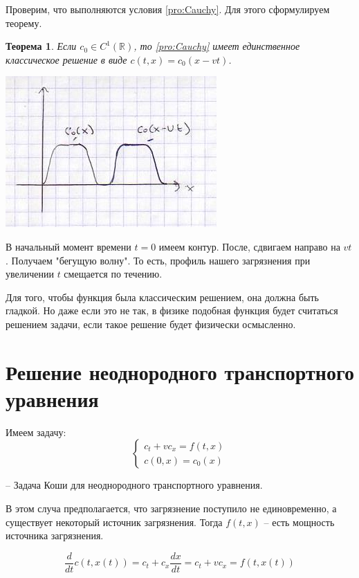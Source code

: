 \documentclass[12pt]{report}
\newtheorem{theorem}{Теорема}
\begin{document}
Проверим, что выполняются условия \eqref{pro:Cauchy}. Для этого сформулируем теорему.

\begin{theorem}
    Если $c_0 \in C^1(\mathbb{R})$, то \eqref{pro:Cauchy} имеет единственное классическое решение в виде $c(t,x) = c_0(x-vt)$.
\end{theorem}

\includegraphics{wave.jpg}

В начальный момент времени $t = 0$ имеем контур. После, сдвигаем направо на $vt$. Получаем "бегущую волну". То есть, профиль нашего загрязнения при увеличении $t$ смещается по течению.

Для того, чтобы функция была классическим решением, она должна быть гладкой. Но даже если это не так, в физике подобная функция будет считаться решением задачи, если такое решение будет физически осмысленно. 

\section{Решение неоднородного транспортного уравнения}

Имеем задачу:
\begin{equation} \label{pro:CauchyInhom}
    \begin{cases}
        c_t + vc_x = f(t,x)
        \\
        c(0, x) = c_0(x)
    \end{cases}
\end{equation}

-- Задача Коши для неоднородного транспортного уравнения. 

В этом случа предполагается, что загрязнение поступило не единовременно, а существует некоторый источник загрязнения. 
Тогда $f(t,x)$ -- есть мощность источника загрязнения. 

$$\frac{d}{dt}c(t, x(t)) = c_t + c_x \frac{dx}{dt} = c_t + vc_x = f(t, x(t))$$
\end{document}
